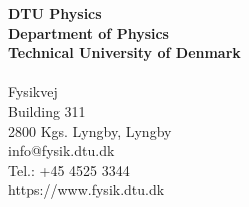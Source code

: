 \thispagestyle{empty} %
\frieze
\vspace*{\fill}
\noindent
\sffamily
\small
\textbf{DTU Physics}\\
\textbf{Department of Physics}\\
\textbf{Technical University of Denmark}\\
\\
Fysikvej\\
Building 311\\
2800 Kgs. Lyngby, Lyngby\\ 
info@fysik.dtu.dk\\ 
Tel.: +45 4525 3344\\ 
https://www.fysik.dtu.dk\\
\normalsize
\normalfont
\vspace*{2.5cm}
